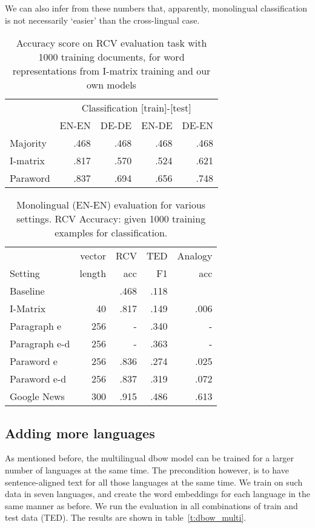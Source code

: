 We can also infer from these numbers that, apparently, monolingual classification is not necessarily `easier' than the cross-lingual case.





\begin{table}\center
\setlength\tabcolsep{2pt}
\begin{tabular}{l | r r r r}
		& \multicolumn{4}{c}{Classification [train]-[test]}	\\
		&EN-EN	&DE-DE	&EN-DE	&DE-EN	\\\hline
Majority	&.468		&.468		&.468		&.468		\\
I-matrix	&.817		&.570		&.524		&.621		\\
Paraword  	&.837		&.694		&.656		&.748		\\
\end{tabular}
\caption{Accuracy score on RCV evaluation task with 1000 training documents, for word representations from I-matrix training and our own models}
\label{t:dbow_bi_klemen}
\end{table}


\begin{table}\center
\setlength\tabcolsep{3pt}
\begin{tabular}{l |rr r r}
 			&vector	&RCV 			&TED		&Analogy\\
Setting		&length	&acc			&F1		&acc\\\hline
Baseline		&		&.468			&.118	 	&		\\
I-Matrix		&40		&.817			&.149		&.006\\
Paragraph e		&256		&- 			&.340		&-\\
Paragraph e-d 	&256		&- 			&.363		&-\\
Paraword e		&256		&.836			&.274		&.025	\\
Paraword e-d	&256		&.837			&.319		&.072\\
Google News		&300		&.915			&.486		&.613\\
\end{tabular}
\caption{Monolingual (EN-EN) evaluation for various settings.
RCV Accuracy: given 1000 training examples for classification.}
\end{table}

\subsection{Adding more languages}
As mentioned before, the multilingual dbow model can be trained for a larger number of languages at the same time. The precondition however, is to have sentence-aligned text for all those languages at the same time. We train on such data in seven languages, and create the word embeddings for each language in the same manner as before. We run the evaluation in all combinations of train and test data (TED). The results are shown in table~\ref{t:dbow_multi}. 

